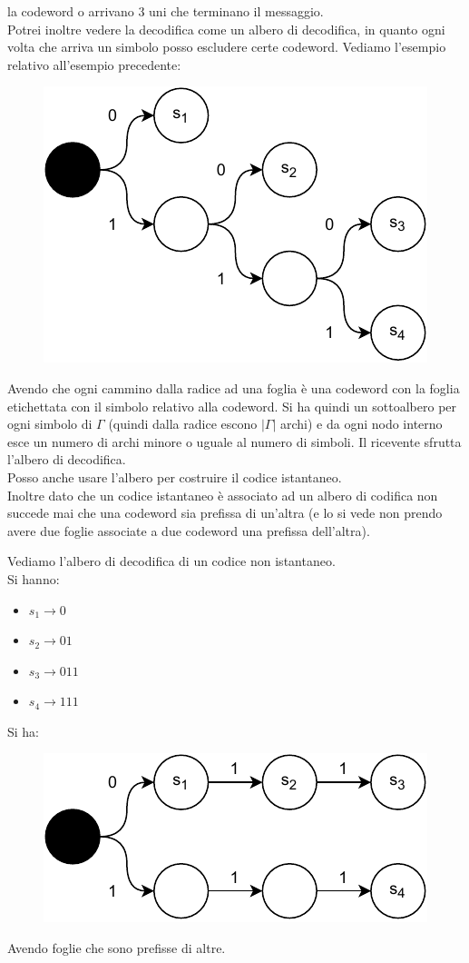 \documentclass[a4paper,12pt, oneside]{book}
\begin{document}
la codeword o arrivano 3 uni che terminano il messaggio.\\
Potrei inoltre vedere la decodifica come un albero di
decodifica, in quanto ogni volta che arriva un simbolo posso escludere certe
codeword.
\newpage
Vediamo l'esempio relativo all'esempio precedente:
\begin{figure}[H]
  \centering
  \includegraphics[scale = 0.8]{img/ct.pdf}
\end{figure}
Avendo che ogni cammino dalla radice ad una foglia è una codeword con la
foglia etichettata con il simbolo relativo alla codeword. Si ha quindi un
sottoalbero per ogni simbolo di $\Gamma$ (quindi dalla radice escono
$|\Gamma|$ archi) e da ogni nodo interno esce un numero
di archi minore o uguale al numero di simboli. Il ricevente sfrutta l'albero di
decodifica.\\ 
Posso anche usare l'albero per costruire il codice istantaneo.\\
Inoltre dato che un codice istantaneo è associato ad un albero di codifica non
succede mai che una codeword sia prefissa di un'altra (e lo si vede non prendo
avere due foglie associate a due codeword una prefissa dell'altra).
\begin{esempio}
  Vediamo l'albero di decodifica di un codice non istantaneo.\\
  Si hanno:
  \begin{itemize}
    \item $s_1\to 0$
    \item $s_2\to 01$
    \item $s_3\to 011$
    \item $s_4\to 111$
  \end{itemize}
  Si ha:
  \begin{figure}[H]
    \centering
    \includegraphics[scale = 0.8]{img/ct2.pdf}
  \end{figure}
  Avendo foglie che sono prefisse di altre.
\end{esempio}
\end{document}
